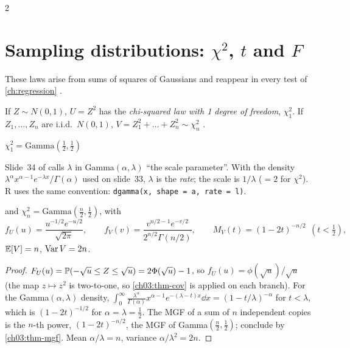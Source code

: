 \begin{paracol}{2}
\section{Sampling distributions: \texorpdfstring{$\chi^2$}{chi-square}, \texorpdfstring{$t$}{t} and \texorpdfstring{$F$}{F}}\label{ch03:sec-chisq}

These laws arise from sums of squares of Gaussians and reappear in every test of \cref{ch:regression}
.

\begin{definition}
If $Z\sim N(0,1)$, $U=Z^2$ has the \emph{chi-squared law with 1 degree of freedom}, $\chi^2_1$. If $Z_1,\dots,Z_n$ are
i.i.d.\ $N(0,1)$, $V=Z_1^2+\dots+Z_n^2\sim\chi^2_n$ .
\end{definition}
\begin{proposition}
$\chi^2_1=\mathrm{Gamma}(\frac12,\frac12)$\begin{coursenote}
Slide~34 of  calls $\lambda$ in Gamma$(\alpha,\lambda)$ ``the scale parameter''. With the density
$\lambda^\alpha x^{\alpha-1}e^{-\lambda x}/\Gamma(\alpha)$ used on slide~33, $\lambda$ is the \emph{rate}; the scale is $1/\lambda$ ($=2$ for
$\chi^2$). R uses the same convention: \texttt{dgamma(x, shape = a, rate = l)}.
\end{coursenote} and $\chi^2_n=\mathrm{Gamma}(\frac n2,\frac12)$, with
\[
  f_U(u)=\frac{u^{-1/2}e^{-u/2}}{\sqrt{2\pi}},\qquad
  f_V(v)=\frac{v^{n/2-1}e^{-v/2}}{2^{n/2}\Gamma(n/2)},\qquad M_V(t)=(1-2t)^{-n/2}\ \ (t<\tfrac12),
\]
$\mathbb{E}[V]=n$, $\operatorname{Var} V=2n$.
\end{proposition}
\begin{proof}
$F_U(u)=\mathbb{P}(-\sqrt u\le Z\le\sqrt u)=2\Phi(\sqrt u)-1$, so $f_U(u)=\phi(\sqrt u)/\sqrt u$ (the map $z\mapsto z^2$ is two-to-one,
so \cref{ch03:thm-cov} is applied on each branch). For the Gamma$(\alpha,\lambda)$ density,
$\int_0^\infty\frac{\lambda^\alpha}{\Gamma(\alpha)}x^{\alpha-1}e^{-(\lambda-t)x}\dd x=(1-t/\lambda)^{-\alpha}$ for $t<\lambda$, which is
$(1-2t)^{-1/2}$ for $\alpha=\lambda=\frac12$. The MGF of a sum of $n$ independent copies is the $n$-th power, $(1-2t)^{-n/2}$,
the MGF of Gamma$(\frac n2,\frac12)$; conclude by \cref{ch03:thm-mgf}. Mean $\alpha/\lambda=n$, variance $\alpha/\lambda^2=2n$.
\end{proof}


\end{paracol}
